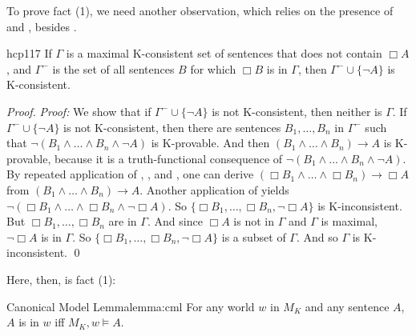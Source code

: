 To prove fact (1), we need another observation, which relies on the presence of
 and , besides .

\begin{observation}{hcp117}
  If $\Gamma$ is a maximal K-consistent set of sentences that does not
  contain $\Box A$, and $\Gamma^{-}$ is the set of all sentences $B$ for which
  $\Box B$ is in $\Gamma$, then $\Gamma^{-} \cup \{ \neg A \}$ is
  K-consistent.
\end{observation}
\begin{proof}
  \emph{Proof:} We show that if $\Gamma^{-} \cup \{ \neg A \}$ is not
  K-consistent, then neither is $\Gamma$. If $\Gamma^- \cup \{ \neg A \}$ is not
  K-consistent, then there are sentences $B_1,\ldots,B_n$ in $\Gamma^{-}$ such
  that $\neg(B_1\land\ldots\land B_n \land \neg A)$ is K-provable. And then
  $(B_1\land\ldots\land B_n) \to A$ is K-provable, because it is a
  truth-functional consequence of $\neg(B_1\land\ldots\land B_n \land \neg A)$.
  By repeated application of , , and , one can derive
  $(\Box B_1\land\ldots\land \Box B_n) \to \Box A$ from
  $(B_1\land\ldots\land B_n) \to A$. Another application of  yields
  $\neg (\Box B_1\land\ldots\land \Box B_n \land \neg\Box A)$. So
  $\{\Box B_1,\ldots,\Box B_n, \neg \Box A\}$ is K-inconsistent. But
  $\Box B_1,\ldots,\Box B_n$ are in $\Gamma$. And since $\Box A$ is not in
  $\Gamma$ and $\Gamma$ is maximal, $\neg \Box A$ is in $\Gamma$. So
  $\{\Box B_1,\ldots,\Box B_n, \neg \Box A\}$ is a subset of $\Gamma$. And so
  $\Gamma$ is K-inconsistent. \qed
\end{proof}

Here, then, is fact (1):

\begin{theorem}{Canonical Model Lemma}{lemma:cml}
  For any world $w$ in $M_K$ and any sentence $A$, $A$ is in $w$ iff
  $M_K,w \models A$.
\end{theorem}

